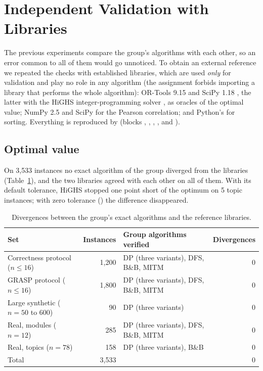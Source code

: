 \section{Independent Validation with Libraries}\label{sec:validation}

The previous experiments compare the group's algorithms with each other, so an error common to all of them would go unnoticed. To obtain an external reference we repeated the checks with established libraries, which are used \emph{only} for validation and play no role in any algorithm (the assignment forbids importing a library that performs the whole algorithm): OR-Tools 9.15 \cite{ortools2026} and SciPy 1.18 \cite{virtanen2020scipy}, the latter with the HiGHS integer-programming solver \cite{huangfu2018highs}, as oracles of the optimal value; NumPy 2.5 \cite{harris2020numpy} and SciPy for the Pearson correlation; and Python's  for sorting. Everything is reproduced by  (blocks , , , ,  and ).

\subsection{Optimal value}

On 3,533 instances no exact algorithm of the group diverged from the libraries (Table~\ref{tab:divergences}), and the two libraries agreed with each other on all of them. With its default tolerance, HiGHS stopped one point short of the optimum on 5 topic instances; with zero tolerance () the difference disappeared.

\begin{table}[h]
\centering
\caption{Divergences between the group's exact algorithms and the reference libraries.}\label{tab:divergences}
\small
\begin{tabularx}{\linewidth}{@{}l r X r@{}}
\toprule
Set & Instances & Group algorithms verified & Divergences\\
\midrule
Correctness protocol ($n\le16$) & 1,200 & DP (three variants), DFS, B\&B, MITM & 0\\
GRASP protocol ($n\le16$) & 1,800 & DP (three variants), DFS, B\&B, MITM & 0\\
Large synthetic ($n=50$ to 600) & 90 & DP (three variants) & 0\\
Real, modules ($n=12$) & 285 & DP (three variants), DFS, B\&B, MITM & 0\\
Real, topics ($n=78$) & 158 & DP (three variants), B\&B & 0\\
\midrule
Total & 3,533 & & 0\\
\bottomrule
\end{tabularx}
\end{table}

